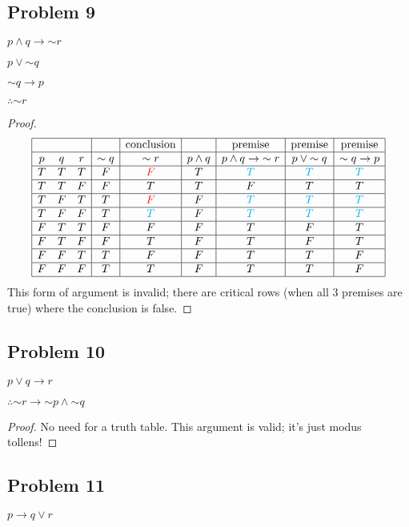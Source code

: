 \documentclass[14pt]{extarticle}
\begin{document}
\subsection{Problem 9}
$p \wedge q \to {\sim r}$

$p \vee {\sim q}$

${\sim q} \to p$

$\therefore {\sim r}$

\begin{proof}
$$
\begin{array}{|ccc|c|c|c|c|c|c|}
\hline
& & & & \text{conclusion} & & \text{premise} & \text{premise} & \text{premise}
\\
\hline
p & q & r & {\sim q} & {\sim r} & p \wedge q & p \wedge q \to {\sim r} & p \vee
{\sim q} & {\sim q} \to p \\
\hline
T & T & T & F & \color{red} F & T & \color{cyan} T & \color{cyan} T &
\color{cyan} T \\
\hline
T & T & F & F & T & T & F & T & T \\
\hline
T & F & T & T & \color{red} F & F & \color{cyan} T & \color{cyan} T &
\color{cyan} T \\
\hline
T & F & F & T & \color{cyan} T & F & \color{cyan} T & \color{cyan} T &
\color{cyan} T \\
\hline
F & T & T & F & F & F & T & F & T \\
\hline
F & T & F & F & T & F & T & F & T \\
\hline
F & F & T & T & F & F & T & T & F \\
\hline
F & F & F & T & T & F & T & T & F \\
\hline
\end{array}
$$
This form of argument is invalid; there are critical rows (when all 3 premises
are true) where the conclusion is false.
\end{proof}

\subsection{Problem 10}
$p \vee q \to r$

$\therefore {\sim r} \to {\sim p} \wedge {\sim q}$

\begin{proof}
No need for a truth table. This argument is valid; it's just modus tollens!
\end{proof}

\subsection{Problem 11}
$p \to q \vee r$
\end{document}
